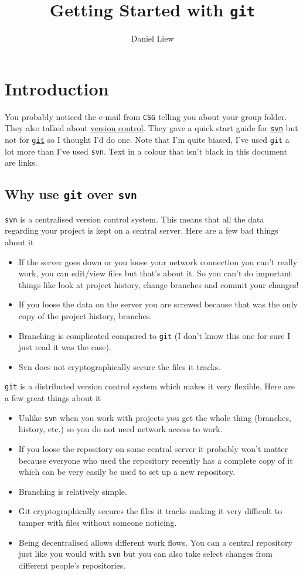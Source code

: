 \documentclass[a4paper,10pt,fleqn]{article}
\title{Getting Started with \texttt{git}}
\author{Daniel Liew}
\begin{document}
\maketitle

\section{Introduction}
You probably noticed the e-mail from \texttt{CSG} telling you about your group folder. They also talked about \href{http://en.wikipedia.org/wiki/Version_control}{version control}. They gave a quick start guide for \href{http://subversion.apache.org/}{\texttt{svn}} but not for \href{http://git-scm.com/}{\texttt{git}} so I thought I'd do one. Note that I'm quite biased, I've used \texttt{git} a lot more than I've used \texttt{svn}. Text in a colour that isn't black in this document are links.

\subsection{Why use \texttt{git} over \texttt{svn}}
\texttt{svn} is a centralised version control system. This means that all the data regarding your project is kept on a central server. Here are a few bad things about it
	\begin{itemize}
	\item If the server goes down or you loose your network connection you can't really work, you can edit/view files but that's about it. So you can't do important things like look at project history, change branches and commit your changes!
	\item If you loose the data on the server you are screwed because that was the only copy of the project history, branches.
	\item Branching is complicated compared to \texttt{git} (I don't know this one for sure I just read it was the case).
	\item Svn does not cryptographically secure the files it tracks.
	\end{itemize}

\texttt{git} is a distributed version control system which makes it very flexible. Here are a few great things about it
	\begin{itemize}
		\item Unlike \texttt{svn} when you work with projects you get the whole thing (branches, history, etc.) so you do not need network access to work.
		\item If you loose the repository on some central server it probably won't matter because everyone who used the repository recently has a complete copy of it which can be very easily be used to set up a new repository.
		\item Branching is relatively simple.
		\item Git cryptographically secures the files it tracks making it very difficult to tamper with files without someone noticing.
		\item Being decentralised allows different work flows. You can a central repository just like you would with \texttt{svn} but you can also take select changes from different people's repositories.
	\end{itemize}
	
\end{document}
